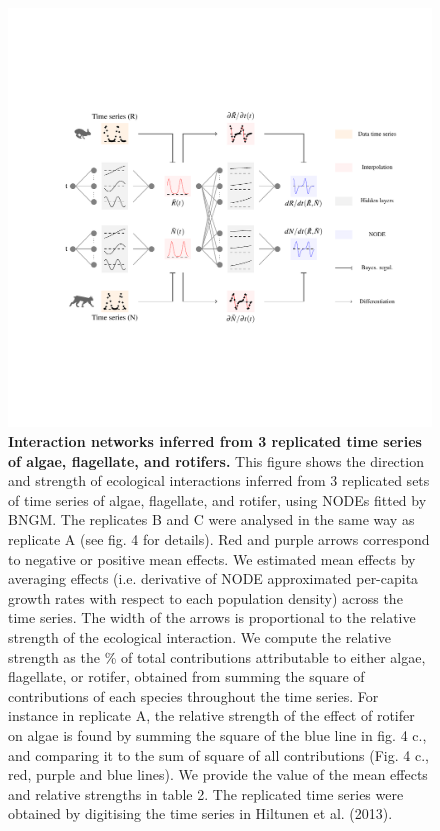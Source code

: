 \documentclass[11pt, oneside]{article}
\begin{document}
\newpage
\begin{figure}[H]
\includegraphics[width=1\linewidth,page=6]{figures/main.pdf}
\vspace{-4cm}
\caption{
    \textbf{Interaction networks inferred from 3 replicated time series of algae, flagellate, and rotifers.}
    This figure shows the direction and strength of ecological interactions inferred from 3 replicated sets of time series of algae, flagellate, and rotifer, using NODEs fitted by BNGM.
    The replicates B and C were analysed in the same way as replicate A (see fig. 4 for details).
    Red and purple arrows correspond to negative or positive mean effects. 
    We estimated mean effects by averaging effects (i.e. derivative of NODE approximated per-capita growth rates with respect to each population density) across the time series.
    The width of the arrows is proportional to the relative strength of the ecological interaction. 
    We compute the relative strength as the \% of total contributions attributable to either algae, flagellate, or rotifer, obtained from summing the square of contributions of each species throughout the time series.
    For instance in replicate A, the relative strength of the effect of rotifer on algae is found by summing the square of the blue line in fig. 4 c., and comparing it to the sum of square of all contributions (Fig. 4 c., red, purple and blue lines).
    We provide the value of the mean effects and relative strengths in table 2.
    The replicated time series were obtained by digitising the time series in Hiltunen et al. (2013).
}
\end{figure}
\newpage
\end{document}
